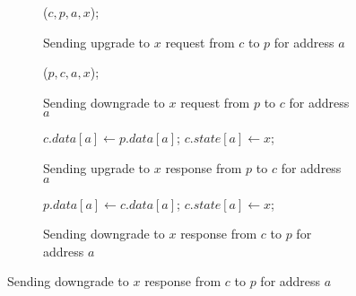 \begin{figure}

\begin{subfigure}{\linewidth}
\begin{boxedminipage}{\linewidth}
\begin{algorithmic}
  \State \call{} \uReq($c, p, a, x$);
\EndProc
\end{algorithmic}
\end{boxedminipage}
\caption{Sending upgrade to $x$ request from $c$ to $p$ for address $a$}
\label{uReq}
\end{subfigure}

\begin{subfigure}{\linewidth}
\begin{boxedminipage}{\linewidth}
\begin{algorithmic}
  \State \call{} \dReq($p, c, a, x$);
\EndProc
\end{algorithmic}
\end{boxedminipage}
\caption{Sending downgrade to $x$ request from $p$ to $c$ for address $a$}
\label{dReq}
\end{subfigure}

\begin{subfigure}{\linewidth}
\begin{boxedminipage}{\linewidth}
\begin{algorithmic}
      \State $c.data[a] \gets p.data[a]$;
    \EndIf
    \State $c.state[a] \gets x$;
  \EndIf
\EndProc
\end{algorithmic}
\end{boxedminipage}
\caption{Sending upgrade to $x$ response from $p$ to $c$ for address $a$}
\label{uResp}
\end{subfigure}

\begin{subfigure}{\linewidth}
\begin{boxedminipage}{\linewidth}
\begin{algorithmic}
      \State $p.data[a] \gets c.data[a]$;
    \EndIf
    \State $c.state[a] \gets x$;
  \EndIf
\EndProc
\end{algorithmic}
\end{boxedminipage}
\caption{Sending downgrade to $x$ response from $c$ to $p$ for address $a$}
\label{dResp}
\end{subfigure}


\end{figure}
